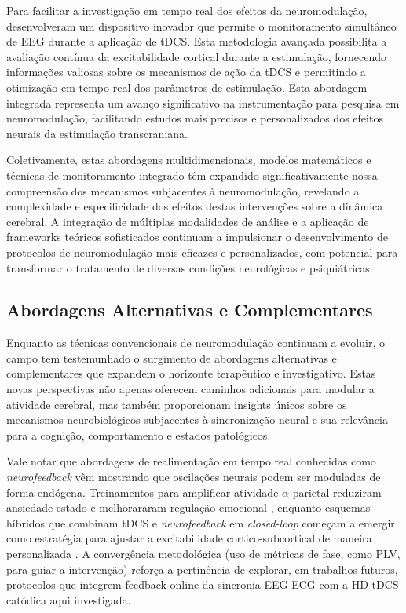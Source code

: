 Para facilitar a investigação em tempo real dos efeitos da neuromodulação,  desenvolveram um dispositivo inovador que permite o monitoramento simultâneo de EEG durante a aplicação de tDCS. Esta metodologia avançada possibilita a avaliação contínua da excitabilidade cortical durante a estimulação, fornecendo informações valiosas sobre os mecanismos de ação da tDCS e permitindo a otimização em tempo real dos parâmetros de estimulação. Esta abordagem integrada representa um avanço significativo na instrumentação para pesquisa em neuromodulação, facilitando estudos mais precisos e personalizados dos efeitos neurais da estimulação transcraniana.

Coletivamente, estas abordagens multidimensionais, modelos matemáticos e técnicas de monitoramento integrado têm expandido significativamente nossa compreensão dos mecanismos subjacentes à neuromodulação, revelando a complexidade e especificidade dos efeitos destas intervenções sobre a dinâmica cerebral. A integração de múltiplas modalidades de análise e a aplicação de frameworks teóricos sofisticados continuam a impulsionar o desenvolvimento de protocolos de neuromodulação mais eficazes e personalizados, com potencial para transformar o tratamento de diversas condições neurológicas e psiquiátricas.

\subsection{Abordagens Alternativas e Complementares}
Enquanto as técnicas convencionais de neuromodulação continuam a evoluir, o campo tem testemunhado o surgimento de abordagens alternativas e complementares que expandem o horizonte terapêutico e investigativo. Estas novas perspectivas não apenas oferecem caminhos adicionais para modular a atividade cerebral, mas também proporcionam insights únicos sobre os mecanismos neurobiológicos subjacentes à sincronização neural e sua relevância para a cognição, comportamento e estados patológicos.

Vale notar que abordagens de realimentação em tempo real conhecidas como \textit{neurofeedback} vêm mostrando que oscilações neurais podem ser moduladas de forma endógena. Treinamentos para amplificar atividade $\alpha$ parietal reduziram ansiedade-estado e melhorararam regulação emocional \cite{hou2021neurofeedback}, enquanto esquemas híbridos que combinam tDCS e \textit{neurofeedback} em \textit{closed-loop} começam a emergir como estratégia para ajustar a excitabilidade cortico-subcortical de maneira personalizada \cite{zilverstand2015fmri}. A convergência metodológica (uso de métricas de fase, como PLV, para guiar a intervenção) reforça a pertinência de explorar, em trabalhos futuros, protocolos que integrem feedback online da sincronia EEG-ECG com a HD-tDCS catódica aqui investigada.

